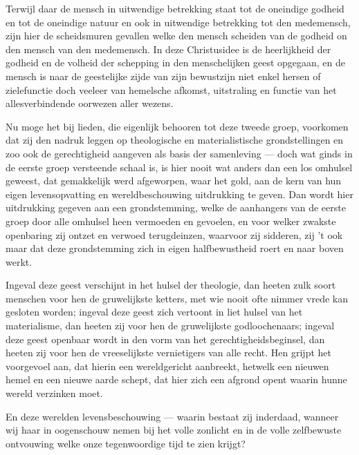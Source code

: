 \documentclass[a4paper, 12pt, oneside, dutch]{article}
\begin{document}
Terwijl daar de mensch in uitwendige betrekking staat tot de oneindige godheid en tot de oneindige natuur en ook in uitwendige betrekking tot den medemensch, zijn hier de scheidsmuren gevallen welke den mensch scheiden van de godheid on den mensch van den medemensch. In deze Christusidee is de heerlijkheid der godheid en de volheid der schepping in den menschelijken geest opgegaan, en de mensch is naar de geestelijke zijde van zijn bewustzijn niet enkel hersen of zielefunctie doch veeleer van hemelsche afkomst, uitstraling en functie van het allesverbindende oorwezen aller wezens.

Nu moge het bij lieden, die eigenlijk behooren tot deze tweede groep, voorkomen dat zij den nadruk leggen op theologische en materialistische grondstellingen en zoo ook de gerechtigheid aangeven als basis der samenleving --- doch wat ginds in de eerste groep versteende schaal is, is hier nooit wat anders dan een los omhulsel geweest, dat gemakkelijk werd afgeworpen, waar het gold, aan de kern van hun eigen levensopvatting en wereldbeschouwing uitdrukking te geven. Dan wordt hier uitdrukking gegeven aan een grondstemming, welke de aanhangers van de eerste groep door alle omhulsel heen vermoeden en gevoelen, en voor welker zwakste openbaring zij ontzet en verwoed terugdeinzen, waarvoor zij sidderen, zij 't ook maar dat deze grondstemming zich in eigen halfbewustheid roert en naar boven werkt.

Ingeval deze geest verschijnt in het hulsel der theologie, dan heeten zulk soort menschen voor hen de gruwelijkste ketters, met wie nooit ofte nimmer vrede kan gesloten worden; ingeval deze geest zich vertoont in liet hulsel van het materialisme, dan heeten zij voor hen de gruwelijkste godloochenaars; ingeval deze geest openbaar wordt in den vorm van het gerechtigheidsbeginsel, dan heeten zij voor hen de vreeselijkste vernietigers van alle recht. Hen grijpt het voorgevoel aan, dat hierin een wereldgericht aanbreekt, hetwelk een nieuwen hemel en een nieuwe aarde schept, dat hier zich een afgrond opent waarin hunne wereld verzinken moet.

En deze werelden levensbeschouwing --- waarin bestaat zij inderdaad, wanneer wij haar in oogenschouw nemen bij het volle zonlicht en in de volle zelfbewuste ontvouwing welke onze tegenwoordige tijd te zien krijgt?
\end{document}
